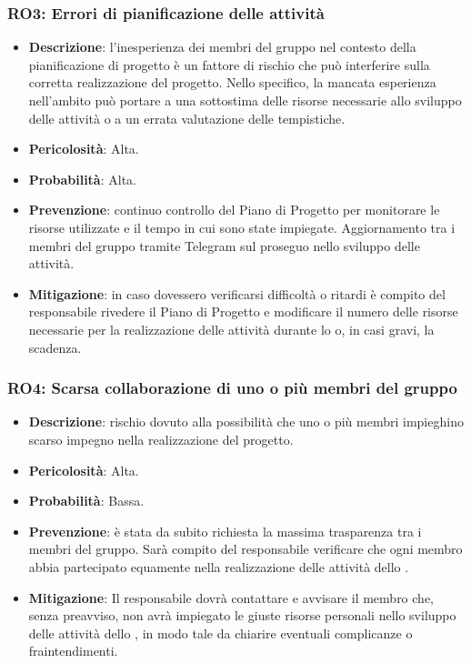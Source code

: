 \subsubsection{RO3: Errori di pianificazione delle attività}
\begin{itemize}
    \item \textbf{Descrizione}: l'inesperienza dei membri del gruppo nel contesto della pianificazione di progetto è un fattore di rischio che può interferire sulla corretta realizzazione del progetto. 
    Nello specifico, la mancata esperienza nell'ambito può portare a una sottostima delle risorse necessarie allo sviluppo delle attività o a un errata valutazione delle tempistiche. 
    \item \textbf{Pericolosità}: Alta.
    \item \textbf{Probabilità}: Alta.
    \item \textbf{Prevenzione}: continuo controllo del Piano di Progetto per monitorare le risorse utilizzate e il tempo in cui sono state impiegate.
    Aggiornamento tra i membri del gruppo tramite Telegram sul proseguo nello sviluppo delle attività.
    \item \textbf{Mitigazione}: in caso dovessero verificarsi difficoltà o ritardi è compito del responsabile rivedere il Piano di Progetto e modificare il numero delle risorse necessarie per la realizzazione delle attività durante lo  o, in casi gravi, la scadenza.
\end{itemize}

\subsubsection{RO4: Scarsa collaborazione di uno o più membri del gruppo}
\begin{itemize}
    \item \textbf{Descrizione}: rischio dovuto alla possibilità che uno o più membri impieghino scarso impegno nella realizzazione del progetto.
    \item \textbf{Pericolosità}: Alta.
    \item \textbf{Probabilità}: Bassa.
    \item \textbf{Prevenzione}: è stata da subito richiesta la massima trasparenza tra i membri del gruppo.
    Sarà compito del responsabile verificare che ogni membro abbia partecipato equamente nella realizzazione delle attività dello .
    \item \textbf{Mitigazione}: Il responsabile dovrà contattare e avvisare il membro che, senza preavviso, non avrà impiegato le giuste risorse personali nello sviluppo delle attività dello , in modo tale da chiarire eventuali complicanze o fraintendimenti. 
\end{itemize}

